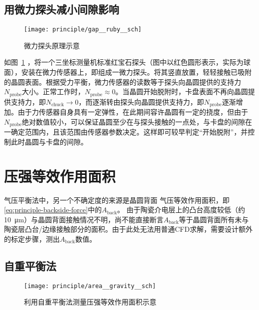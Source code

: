 \subsection{用微力探头减小间隙影响}\label{principle-gap-ruby}

\begin{figure}[tbhp]
\centering
\texttt{[image: principle/gap\_\_ruby\_\_sch]}
\caption{微力探头原理示意}
\label{fig:principle-gap-ruby-sch}
\end{figure}

如图~\ref{fig:principle-gap-ruby-sch} ，将一个三坐标测量机标准红宝石探头（图中以红色圆形表示，实际为球面），安装在微力传感器上，即组成一微力探头。将其竖直放置，轻轻接触已吸附的晶圆表面。根据受力平衡，微力传感器的读数等于探头向晶圆提供的支持力$N_{\mathrm{probe}}$大小。正常工作时，$N_{\mathrm{probe}} \approx 0$。当晶圆开始脱附时，卡盘表面不再向晶圆提供支持力，即$N_{\mathrm{chuck}} \to 0$，而逐渐转由探头向晶圆提供支持力，即$N_{\mathrm{probe}}$逐渐增加。由于力传感器自身具有一定弹性，在此期间容许晶圆有一定的挠度，但由于$N_{\mathrm{probe}}$绝对数值较小，可以保证晶圆至少在与探头接触的一点处，与卡盘的间隙在一确定范围内，且该范围由传感器参数决定。这样即可较早判定“开始脱附”，并控制此时晶圆与卡盘的间隙。




\section{压强等效作用面积}\label{principle-area}

气压平衡法中，另一个不确定度的来源是晶圆背面 气压等效作用面积，即\eqref{eq:principle-backside-force}中的$A_{\mathrm{back}}$。
由于陶瓷介电层上的凸台高度较低（约\SI{10}{\micro\meter}）与晶圆背面接触情况不明，尚不能直接断言$A_{\mathrm{back}}$等于晶圆背面所有未与陶瓷层凸台/边缘接触部分的面积。由于此处无法用普通CFD求解，需要设计额外的标定步骤，测出$A_{\mathrm{back}}$数值。


\subsection{自重平衡法}\label{sec:principle-area-gravity}

\begin{figure}[tbhp]
\centering
\texttt{[image: principle/area\_\_gravity\_\_sch]}
\caption[自重法测等效面积示意]{利用自重平衡法测量压强等效作用面积示意}
\label{fig:principle-area-gravity-sch}
\end{figure}

